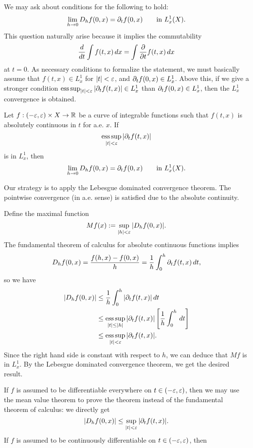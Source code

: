 \documentclass{../exp}
\begin{document}
We may ask about conditions for the following to hold:
\[\lim_{h\to0}D_hf(0,x)=\pd_tf(0,x)\qquad\text{in }L_x^1(X).\]
This question naturally arise because it implies the commutability
\[\dd{t}\int f(t,x)\,dx=\int\pd{t}f(t,x)\,dx\]
at $t=0$.
As necessary conditions to formalize the statement, we must basically assume that $f(t,x)\in L_x^1$ for $|t|<\varepsilon$, and $\pd_tf(0,x)\in L_x^1$.
Above this, if we give a stronger condition $\esssup_{|t|<\e}|\pd_tf(t,x)|\in L_x^1$ than $\pd_tf(0,x)\in L_x^1$, then the $L_x^1$ convergence is obtained.
\begin{thm}
Let $f:(-\e,\e)\times X\to\R$ be a curve of integrable functions such that $f(t,x)$ is absolutely continuous in $t$ for a.e. $x$.
If
\[\esssup_{|t|<\e}|\pd_tf(t,x)|\]
is in $L_x^1$, then
\[\lim_{h\to0}D_hf(0,x)=\pd_tf(0,x)\qquad\text{in }L_x^1(X).\]
\end{thm}
\begin{pf}
Our strategy is to apply the Lebesgue dominated convergence theorem.
The pointwise convergence (in a.e. sense) is satisfied due to the absolute continuity.

Define the maximal function
\[Mf(x):=\sup_{|h|<\varepsilon}|D_hf(0,x)|.\]
The fundamental theorem of calculus for absolute continuous functions implies
\[D_hf(0,x)=\frac{f(h,x)-f(0,x)}h=\frac1h\int_0^h\pd_tf(t,x)\,dt,\]
so we have
\begin{align*}
|D_hf(0,x)|&\le\frac1h\int_0^h|\pd_tf(t,x)|\,dt\\
&\le\esssup_{|t|\le|h|}|\pd_tf(t,x)|\left[\frac1h\int_0^h\,dt\right]\\
&\le\esssup_{|t|<\e}|\pd_tf(t,x)|.
\end{align*}
Since the right hand side is constant with respect to $h$, we can deduce that $Mf$ is in $L_x^1$.
By the Lebesgue dominated convergence theorem, we get the desired result.
\end{pf}
\begin{rmk}
If $f$ is assumed to be differentiable everywhere on $t\in(-\varepsilon,\varepsilon)$, then we may use the mean value theorem to prove the theorem instead of the fundamental theorem of calculus:
we directly get
\[|D_hf(0,x)|\le\sup_{|t|<\e}|\pd_tf(t,x)|.\]
If $f$ is assumed to be continuously differentiable on $t\in(-\varepsilon,\varepsilon)$, then 
\end{rmk}
\end{document}
